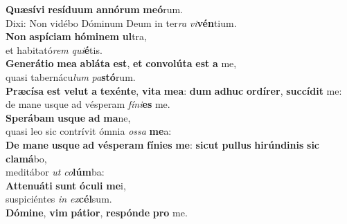 \evenverse \textbf{Quæ}\textbf{sí}\textbf{vi} \textbf{re}\textbf{sí}\textbf{du}\textbf{um} \textbf{an}\textbf{nó}\textbf{rum} \textbf{me}\textbf{ó}rum.~\*\\
\evenverse Dixi: Non vidébo Dóminum Deum in ter\textit{ra} \textit{vi}\textbf{vén}tium.\\
\oddverse \textbf{Non} \textbf{a}\textbf{spí}\textbf{ci}\textbf{am} \textbf{hó}\textbf{mi}\textbf{nem} \textbf{ul}tra,~\*\\
\oddverse et habitató\textit{rem} \textit{qui}\textbf{é}tis.\\
\evenverse \textbf{Ge}\textbf{ne}\textbf{rá}\textbf{ti}\textbf{o} \textbf{me}\textbf{a} \textbf{a}\textbf{blá}\textbf{ta} \textbf{est}, \textbf{et} \textbf{con}\textbf{vo}\textbf{lú}\textbf{ta} \textbf{est} \textbf{a} me,~\*\\
\evenverse quasi tabernácu\textit{lum} \textit{pa}\textbf{stó}rum.\\
\oddverse \textbf{Præ}\textbf{cí}\textbf{sa} \textbf{est} \textbf{ve}\textbf{lut} \textbf{a} \textbf{te}\textbf{xén}\textbf{te}, \textbf{vi}\textbf{ta} \textbf{me}\textbf{a}: \textbf{dum} \textbf{a}\textbf{dhuc} \textbf{or}\textbf{dí}\textbf{rer}, \textbf{suc}\textbf{cí}\textbf{dit} me:~\*\\
\oddverse de mane usque ad vésperam \textit{fí}\textit{ni}\textbf{es} me.\\
\evenverse \textbf{Spe}\textbf{rá}\textbf{bam} \textbf{us}\textbf{que} \textbf{ad} \textbf{ma}ne,~\*\\
\evenverse quasi leo sic contrívit ómnia \textit{os}\textit{sa} \textbf{me}a:\\
\oddverse \textbf{De} \textbf{ma}\textbf{ne} \textbf{us}\textbf{que} \textbf{ad} \textbf{vé}\textbf{spe}\textbf{ram} \textbf{fí}\textbf{ni}\textbf{es} \textbf{me}: \textbf{si}\textbf{cut} \textbf{pul}\textbf{lus} \textbf{hi}\textbf{rún}\textbf{di}\textbf{nis} \textbf{sic} \textbf{cla}\textbf{má}bo,~\*\\
\oddverse meditábor \textit{ut} \textit{co}\textbf{lúm}ba:\\
\evenverse \textbf{At}\textbf{te}\textbf{nu}\textbf{á}\textbf{ti} \textbf{sunt} \textbf{ó}\textbf{cu}\textbf{li} \textbf{me}i,~\*\\
\evenverse suspiciéntes \textit{in} \textit{ex}\textbf{cél}sum.\\
\oddverse \textbf{Dó}\textbf{mi}\textbf{ne}, \textbf{vim} \textbf{pá}\textbf{ti}\textbf{or}, \textbf{re}\textbf{spón}\textbf{de} \textbf{pro} me.~\*\\
